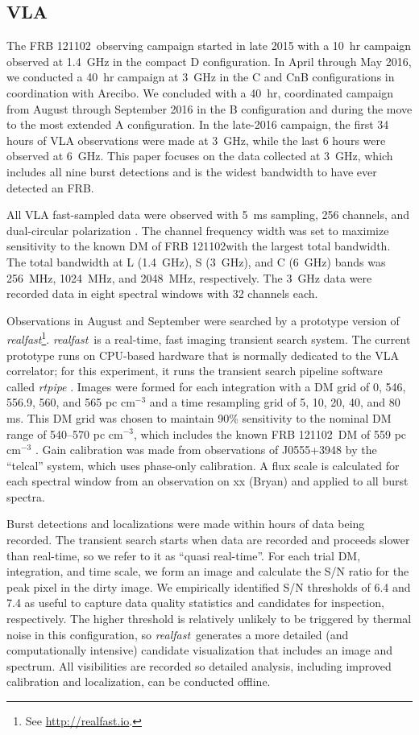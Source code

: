 \documentclass[twocolumn]{aastex61}
\newcommand{\rf}{\emph{realfast}}
\newcommand{\frb}{FRB 121102}
\begin{document}
\subsection{VLA}
The \frb\ observing campaign started in late 2015 with a 10~hr campaign observed at 1.4~GHz in the compact D configuration. In April through May 2016, we conducted a 40~hr campaign at 3~GHz in the C and CnB configurations in coordination with Arecibo. We concluded with a 40~hr, coordinated campaign from August through September 2016 in the B configuration and during the move to the most extended A configuration. In the late-2016 campaign, the first 34 hours of VLA observations were made at 3~GHz, while the last 6 hours were observed at 6~GHz. This paper focuses on the data collected at 3~GHz, which includes all nine burst detections and is the widest bandwidth to have ever detected an FRB.

All VLA fast-sampled data were observed with 5~ms sampling, 256 channels, and dual-circular polarization \citep{2015ApJ...807...16L}. The channel frequency width was set to maximize sensitivity to the known DM of \frb with the largest total bandwidth. The total bandwidth at L (1.4~GHz), S (3~GHz), and C (6~GHz) bands was 256~MHz, 1024~MHz, and 2048~MHz, respectively. The 3~GHz data were recorded data in eight spectral windows with 32 channels each.

Observations in August and September were searched by a prototype version of \rf\footnote{See \url{http://realfast.io}.}. \rf\ is a real-time, fast imaging transient search system. The current prototype runs on CPU-based hardware that is normally dedicated to the VLA correlator; for this experiment, it runs the transient search pipeline software called \emph{rtpipe} \citep[\url{https://github.com/caseyjlaw/rtpipe};][]{2015ApJ...807...16L}. Images were formed for each integration with a DM grid of 0, 546, 556.9, 560, and 565 pc cm$^{-3}$ and a time resampling grid of 5, 10, 20, 40, and 80 ms. This DM grid was chosen to maintain 90\% sensitivity to the nominal DM range of 540--570 pc cm$^{-3}$, which includes the known \frb\ DM of 559 pc cm$^{-3}$ \citep{2016arXiv160308880S}. Gain calibration was made from observations of J0555+3948 by the ``telcal'' system, which uses phase-only calibration. A flux scale is calculated for each spectral window from an observation on {\color{red}xx (Bryan)} and applied to all burst spectra.

Burst detections and localizations were made within hours of data being recorded. The transient search starts when data are recorded and proceeds slower than real-time, so we refer to it as ``quasi real-time''. For each trial DM, integration, and time scale, we form an image and calculate the S/N ratio for the peak pixel in the dirty image. We empirically identified S/N thresholds of 6.4 and 7.4 as useful to capture data quality statistics and candidates for inspection, respectively. The higher threshold is relatively unlikely to be triggered by thermal noise in this configuration, so \rf\ generates a more detailed (and computationally intensive) candidate visualization that includes an image and spectrum. All visibilities are recorded so detailed analysis, including improved calibration and localization, can be conducted offline. 
\end{document}
